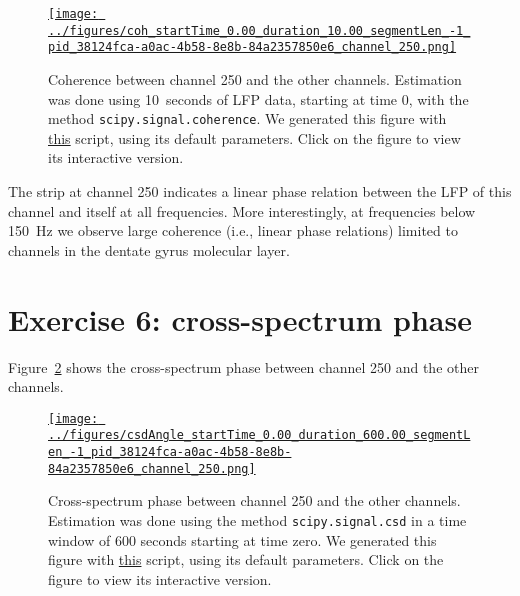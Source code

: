 \documentclass[12pt]{article}
\begin{document}
\begin{figure}[H]
    \begin{center}
        \href{https://www.gatsby.ucl.ac.uk/~rapela/neuroinformatics/2023/ws3/figures/coh_startTime_0.00_duration_10.00_segmentLen_-1_pid_38124fca-a0ac-4b58-8e8b-84a2357850e6_channel_250.html}{\texttt{[image: ../figures/coh\_startTime\_0.00\_duration\_10.00\_segmentLen\_-1\_pid\_38124fca-a0ac-4b58-8e8b-84a2357850e6\_channel\_250.png]}}

        \caption{Coherence between channel 250 and the other channels.
        Estimation was done using 10~seconds of LFP data, starting at time 0,
        with the method \texttt{scipy.signal.coherence}.
        We generated this figure with
        \href{https://github.com/joacorapela/neuroinformatics23/blob/master/worksheets/ws3/mySolution/code/scripts/doPlotCoherence.py}{this}
        script, using its default parameters.
        Click on the figure to view its interactive version.}

                \label{fig:coherenceChannel250WithOthers}

            \end{center}
        \end{figure}

The strip at channel 250 indicates a linear phase relation between the LFP of
this channel and itself at all frequencies. More interestingly, at frequencies
below 150~Hz we observe large coherence (i.e., linear phase relations) limited
to channels in the dentate gyrus molecular layer.

\section*{Exercise 6: cross-spectrum phase}

Figure~\ref{fig:crossSpectrumPhaseChannel250WithOthers} shows the
cross-spectrum phase between
channel 250 and the other channels.

\begin{figure}[H]
    \begin{center}
        \href{https://www.gatsby.ucl.ac.uk/~rapela/neuroinformatics/2023/ws3/figures/csdAngle_startTime_0.00_duration_600.00_segmentLen_-1_pid_38124fca-a0ac-4b58-8e8b-84a2357850e6_channel_250.html}{\texttt{[image: ../figures/csdAngle\_startTime\_0.00\_duration\_600.00\_segmentLen\_-1\_pid\_38124fca-a0ac-4b58-8e8b-84a2357850e6\_channel\_250.png]}}

        \caption{Cross-spectrum phase between channel 250 and the other
        channels. Estimation was done using the method
        \texttt{scipy.signal.csd} in a time window of 600 seconds starting at
        time zero.  We generated this figure with 
        \href{https://github.com/joacorapela/neuroinformatics23/blob/master/worksheets/ws3/mySolution/code/scripts/doPlotCrossSpectrumPhase.py}{this}
        script, using its default parameters.
        Click on the figure to view its interactive version.}

        \label{fig:crossSpectrumPhaseChannel250WithOthers}

        \end{center}
\end{figure}
\end{document}
